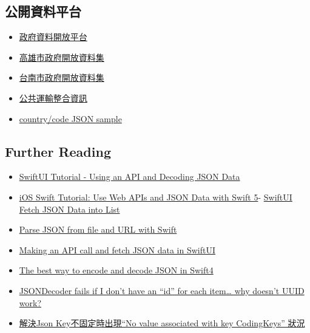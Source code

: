 \documentclass[a4paper,12pt]{article}
\begin{document}
\subsection{公開資料平台}
\label{sec:org303fd58}
\begin{itemize}
\item \href{https://data.gov.tw/}{政府資料開放平台}\\
\item \href{https://data.kcg.gov.tw/dataset}{高雄市政府開放資料集}\\
\item \href{https://data.tainan.gov.tw/dataset}{台南市政府開放資料集}\\
\item \href{https://ptx.transportdata.tw/PTX/Service}{公共運輸整合資訊}\\
\item \href{https://kaleidosblog.s3-eu-west-1.amazonaws.com/json/tutorial.json}{country/code JSON sample}\\
\end{itemize}
\subsection{Further Reading}
\label{sec:org1b12cfa}
\begin{itemize}
\item \href{https://www.youtube.com/watch?v=HvfE4G9PfeU}{SwiftUI Tutorial - Using an API and Decoding JSON Data}\\
\item \href{https://www.youtube.com/watch?v=tdxKIPpPDAI}{iOS Swift Tutorial: Use Web APIs and JSON Data with Swift 5}- \href{https://www.ioscreator.com/tutorials/swiftui-json-list-tutorial}{SwiftUI Fetch JSON Data into List}\\
\item \href{https://programmingwithswift.com/parse-json-from-file-and-url-with-swift/}{Parse JSON from file and URL with Swift}\\
\item \href{https://www.youtube.com/watch?v=1en4JyW3XSI}{Making an API call and fetch JSON data in SwiftUI}\\
\item \href{https://benoitpasquier.com/encoding-decoding-json-swift4/}{The best way to encode and decode JSON in Swift4 }\\
\item \href{https://www.reddit.com/r/swift/comments/emw0i3/jsondecoder\_fails\_if\_i\_dont\_have\_an\_id\_for\_each/}{JSONDecoder fails if I don't have an ``id'' for each item\ldots{} why doesn't UUID work?}\\
\item \href{https://medium.com/\%E5\%BD\%BC\%E5\%BE\%97\%E6\%BD\%98\%E7\%9A\%84-swift-ios-app-\%E9\%96\%8B\%E7\%99\%BC\%E6\%95\%99\%E5\%AE\%A4/\%E8\%A7\%A3\%E6\%B1\%BAjson-key\%E4\%B8\%8D\%E5\%9B\%BA\%E5\%AE\%9A\%E6\%99\%82\%E5\%87\%BA\%E7\%8F\%BE-no-value-associated-with-key-codingkeys-\%E7\%8B\%80\%E6\%B3\%81-720d7d09486a}{解決Json Key不固定時出現“No value associated with key CodingKeys” 狀況}\\
\end{itemize}
\newpage
\end{document}
